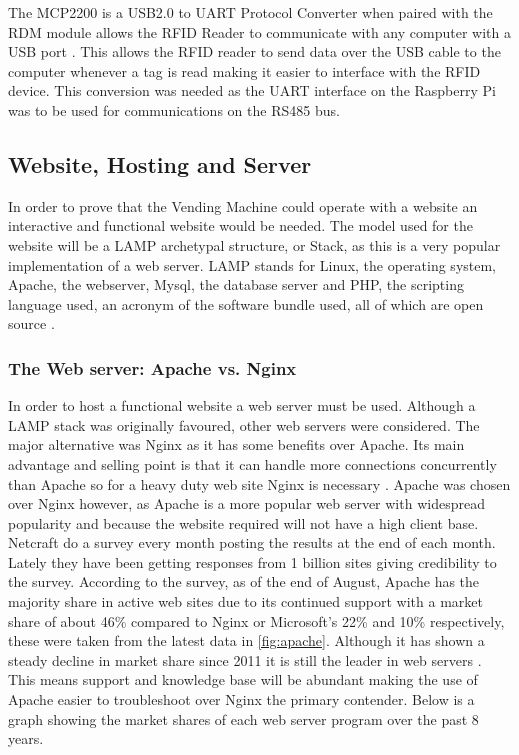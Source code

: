 \documentclass[a4paper,11pt]{article}
\numberwithin{figure}{section}
\numberwithin{table}{section}
\begin{document}
The MCP2200 is a USB2.0 to UART Protocol Converter when paired with the RDM module allows the RFID Reader to communicate with any computer with a USB port \cite{MCP}. This allows the RFID reader to send data over the USB cable to the computer whenever a tag is read making it easier to interface with the RFID device. This conversion was needed as the UART interface on the Raspberry Pi was to be used for communications on the RS485 bus.

\subsection{Website, Hosting and Server}
\label{subsec:litweb}
In order to prove that the Vending Machine could operate with a website an interactive and functional website would be needed. The model used for the website will be a LAMP archetypal structure, or Stack, as this is a very popular implementation of a web server. LAMP stands for Linux, the operating system, Apache, the webserver, Mysql, the database server and PHP, the scripting language used, an acronym of the software bundle used, all of which are open source \cite{LAMP}.  

\subsubsection{The Web server: Apache vs. Nginx }
In order to host a functional website a web server must be used. Although a LAMP stack was originally favoured, other web servers were considered. The major alternative was Nginx as it has some benefits over Apache. Its main advantage and selling point is that it can handle more connections concurrently than Apache so for a heavy duty web site Nginx is necessary \cite{Nginx}. 
Apache was chosen over Nginx however, as Apache is a more popular web server with widespread popularity and because the website required will not have a high client base. Netcraft do a survey every month posting the results at the end of each month. Lately they have been getting responses from 1 billion sites giving credibility to the survey. According to the survey, as of the end of August, Apache has the majority share in active web sites due to its continued support with a market share of about 46\% compared to Nginx or Microsoft's 22\% and 10\% respectively, these were taken from the latest data in \autoref{fig:apache}. Although it has shown a steady decline in market share since 2011 it is still the leader in web servers \cite{Apache}. This means support and knowledge base will be abundant making the use of Apache easier to troubleshoot over Nginx the primary contender. Below is a graph showing the market shares of each web server program over the past 8 years.
	
\end{document}
